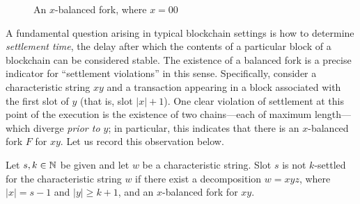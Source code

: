 \begin{figure}[ht]
  \centering
  \caption{An $x$-balanced fork, where $x=00$}
  \label{fig:x-balanced}
\end{figure}


A fundamental question arising in typical blockchain settings is how
to determine \emph{settlement time}, the delay after which the
contents of a particular block of a blockchain can be considered
stable. The existence of a balanced fork is a precise indicator for
``settlement violations'' in this sense. Specifically, consider a
characteristic string $xy$ and a transaction appearing in a block
associated with the first slot of $y$ (that is, slot $|x| + 1$). One
clear violation of settlement at this point of the execution is the
existence of two chains---each of maximum length---which diverge
\emph{prior to $y$}; in particular, this indicates that there is an
$x$-balanced fork $F$ for $xy$. Let us record this observation below.

\begin{observation}\label{obs:settlement-balanced-fork}
  Let $s, k \in \mathbb{N}$ be given and 
  let $w$ be a characteristic string. 
  Slot $s$ is not $k$-settled for the characteristic string $w$ 
  if 
  there exist a decomposition $w = xyz$, 
  where $|x| = s - 1$ and $|y| \geq k+1$, 
  and an $x$-balanced fork for $xy$. 
\end{observation}

